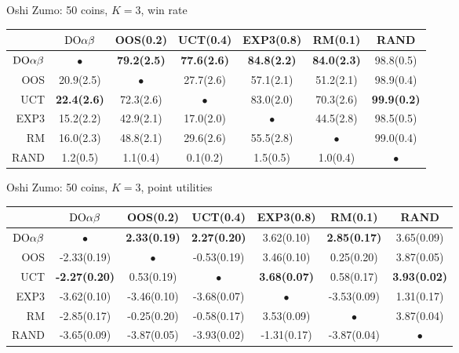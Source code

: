 \begin{table}[t!]
\centering
\begin{scriptsize}

Oshi Zumo: 50 coins, $K=3$, win rate
\begin{tabular}{|r|cccccc|}\hline
&$\textrm{DO}\alpha\beta$&OOS(0.2)&UCT(0.4)&EXP3(0.8)&RM(0.1)&RAND\\\hline
$\textrm{DO}\alpha\beta$&$\bullet$&\textbf{79.2(2.5)}&\textbf{77.6(2.6)}&\textbf{84.8(2.2)}&\textbf{84.0(2.3)}&98.8(0.5)\\
OOS&20.9(2.5)&$\bullet$&27.7(2.6)&57.1(2.1)&51.2(2.1)&98.9(0.4)\\
UCT&\textbf{22.4(2.6)}&72.3(2.6)&$\bullet$&83.0(2.0)&70.3(2.6)&\textbf{99.9(0.2)}\\
EXP3&15.2(2.2)&42.9(2.1)&17.0(2.0)&$\bullet$&44.5(2.8)&98.5(0.5)\\
RM&16.0(2.3)&48.8(2.1)&29.6(2.6)&55.5(2.8)&$\bullet$&99.0(0.4)\\
RAND&1.2(0.5)&1.1(0.4)&0.1(0.2)&1.5(0.5)&1.0(0.4)&$\bullet$\\
\hline
\end{tabular}

Oshi Zumo: 50 coins, $K=3$, point utilities
\begin{tabular}{|r|cccccc|}\hline
&$\textrm{DO}\alpha\beta$&OOS(0.2)&UCT(0.4)&EXP3(0.8)&RM(0.1)&RAND\\\hline
$\textrm{DO}\alpha\beta$&$\bullet$&\textbf{2.33(0.19)}&\textbf{2.27(0.20)}&3.62(0.10)&\textbf{2.85(0.17)}&3.65(0.09)\\
OOS&-2.33(0.19)&$\bullet$&-0.53(0.19)&3.46(0.10)&0.25(0.20)&3.87(0.05)\\
UCT&\textbf{-2.27(0.20)}&0.53(0.19)&$\bullet$&\textbf{3.68(0.07)}&0.58(0.17)&\textbf{3.93(0.02)}\\
EXP3&-3.62(0.10)&-3.46(0.10)&-3.68(0.07)&$\bullet$&-3.53(0.09)&1.31(0.17)\\
RM&-2.85(0.17)&-0.25(0.20)&-0.58(0.17)&3.53(0.09)&$\bullet$&3.87(0.04)\\
RAND&-3.65(0.09)&-3.87(0.05)&-3.93(0.02)&-1.31(0.17)&-3.87(0.04)&$\bullet$\\
\hline
\end{tabular}


\end{scriptsize}
\end{table}
